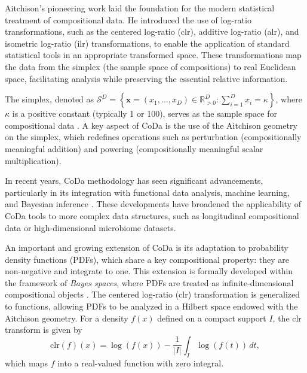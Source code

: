 \documentclass[
	12pt,				%
	oneside,			%
	a4paper,			%
	english,			%
	brazil				%
	]{abntex2ppgsi}
\begin{document}
Aitchison's pioneering work \cite{aitchison1986statistical} laid the foundation for the modern statistical treatment of compositional data. He introduced the use of log-ratio transformations, such as the centered log-ratio (clr), additive log-ratio (alr), and isometric log-ratio (ilr) transformations, to enable the application of standard statistical tools in an appropriate transformed space. These transformations map the data from the simplex (the sample space of compositions) to real Euclidean space, facilitating analysis while preserving the essential relative information.

The simplex, denoted as $\mathcal{S}^D = \left\{ \mathbf{x} = (x_1, \ldots, x_D) \in \mathbb{R}^D_{>0} : \sum_{i=1}^D x_i = \kappa \right\}$, where $\kappa$ is a positive constant (typically 1 or 100), serves as the sample space for compositional data \cite{egozcue2003isometric}. A key aspect of CoDa is the use of the Aitchison geometry on the simplex, which redefines operations such as perturbation (compositionally meaningful addition) and powering (compositionally meaningful scalar multiplication).

In recent years, CoDa methodology has seen significant advancements, particularly in its integration with functional data analysis, machine learning, and Bayesian inference \cite{van2013analyzing,greenacre2018compositional}. These developments have broadened the applicability of CoDa tools to more complex data structures, such as longitudinal compositional data or high-dimensional microbiome datasets.



An important and growing extension of CoDa is its adaptation to probability density functions (PDFs), which share a key compositional property: they are non-negative and integrate to one. This extension is formally developed within the framework of \textit{Bayes spaces}, where PDFs are treated as infinite-dimensional compositional objects \cite{egozcue2006hilbert}. The centered log-ratio (clr) transformation is generalized to functions, allowing PDFs to be analyzed in a Hilbert space endowed with the Aitchison geometry. For a density $f(x)$ defined on a compact support $I$, the clr transform is given by
\[
\text{clr}(f)(x) = \log(f(x)) - \frac{1}{|I|} \int_I \log(f(t))\,dt,
\]
which maps $f$ into a real-valued function with zero integral.
\end{document}
